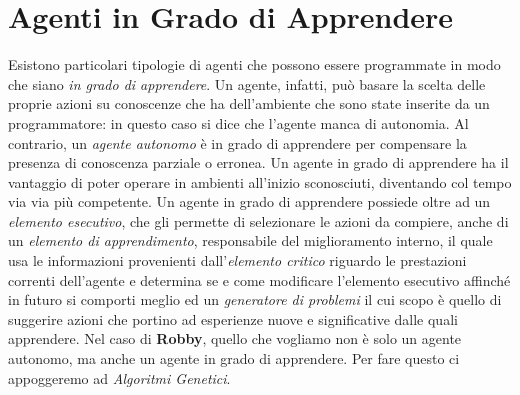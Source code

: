 \section{Agenti in Grado di Apprendere}
Esistono particolari tipologie di agenti che possono essere programmate in modo
che siano \textit{in grado di apprendere}. Un agente, infatti, può basare la
scelta delle proprie azioni su conoscenze che ha dell'ambiente che sono state
inserite da un programmatore: in questo caso si dice che l'agente manca di
autonomia. Al contrario, un \textit{agente autonomo} è in grado di apprendere
per compensare la presenza di conoscenza parziale o erronea.\newline
Un agente in grado di apprendere ha il vantaggio di poter operare in ambienti
all'inizio sconosciuti, diventando col tempo via via più competente.\newline
Un agente in grado di apprendere possiede oltre ad un \textit{elemento
esecutivo}, che gli permette di selezionare le azioni da compiere, anche di un
\textit{elemento di apprendimento}, responsabile del miglioramento interno, il
quale usa le informazioni provenienti dall'\textit{elemento critico} riguardo le
prestazioni correnti dell'agente e determina se e come modificare l'elemento
esecutivo affinché in futuro si comporti meglio ed un \textit{generatore di
problemi} il cui scopo è quello di suggerire azioni che portino ad esperienze
nuove e significative dalle quali apprendere.\newline
Nel caso di \textbf{Robby}, quello che vogliamo non è solo un agente autonomo,
ma anche un agente in grado di apprendere. Per fare questo ci appoggeremo ad
\textit{Algoritmi Genetici}.

